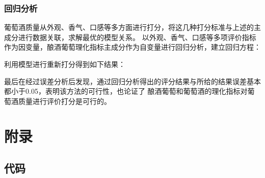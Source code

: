 \documentclass[UTF8]{ctexart}
\begin{document}
\subsubsection{回归分析}
葡萄酒质量从外观、香气、口感等多方面进行打分，将这几种打分标准与上述的主成分进行数据关联，求解最优的模型关系。
以外观、香气、口感等多项评价指标作为因变量，酿酒葡萄理化指标主成分作为自变量进行回归分析，建立回归方程：


利用模型进行重新打分得到如下结果：

最后在经过误差分析后发现，通过回归分析得出的评分结果与所给的结果误差基本都小于0.05，表明该方法的可行性，也论证了
酿酒葡萄和葡萄酒的理化指标对葡萄酒质量进行评价打分是可行的。


\clearpage

\clearpage


\section{附录}
\subsection{代码}
\end{document}
